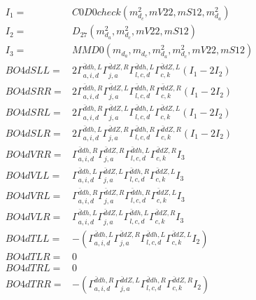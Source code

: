 \documentclass[A4,landscape]{article}
\begin{document}
\begin{align} 
I_1 = & C0D0check(m^2_{d_{{c}}}, mV22, mS12, m^2_{d_{{a}}}) \\ 
I_2 = & D_{27}(m^2_{d_{{a}}}, m^2_{d_{{c}}}, mV22, mS12) \\ 
I_3 = & MMD0(m_{d_{{a}}}, m_{d_{{c}}}, m^2_{d_{{a}}}, m^2_{d_{{c}}}, mV22, mS12) \\ 
  BO4dSLL= & 2  \Gamma^{\bar{d}d h ,L}_{a, i, d} \Gamma^{\bar{d}d Z ,R}_{j, a} \Gamma^{\bar{d}d h ,L}_{l, c, d} \Gamma^{\bar{d}d Z ,L}_{c, k} (I_1 - 2 I_2) \\ 
  BO4dSRR= & 2  \Gamma^{\bar{d}d h ,R}_{a, i, d} \Gamma^{\bar{d}d Z ,L}_{j, a} \Gamma^{\bar{d}d h ,R}_{l, c, d} \Gamma^{\bar{d}d Z ,R}_{c, k} (I_1 - 2 I_2) \\ 
  BO4dSRL= & 2  \Gamma^{\bar{d}d h ,R}_{a, i, d} \Gamma^{\bar{d}d Z ,L}_{j, a} \Gamma^{\bar{d}d h ,L}_{l, c, d} \Gamma^{\bar{d}d Z ,L}_{c, k} (I_1 - 2 I_2) \\ 
  BO4dSLR= & 2  \Gamma^{\bar{d}d h ,L}_{a, i, d} \Gamma^{\bar{d}d Z ,R}_{j, a} \Gamma^{\bar{d}d h ,R}_{l, c, d} \Gamma^{\bar{d}d Z ,R}_{c, k} (I_1 - 2 I_2) \\ 
  BO4dVRR= &  \Gamma^{\bar{d}d h ,R}_{a, i, d} \Gamma^{\bar{d}d Z ,R}_{j, a} \Gamma^{\bar{d}d h ,L}_{l, c, d} \Gamma^{\bar{d}d Z ,R}_{c, k} I_3 \\ 
  BO4dVLL= &  \Gamma^{\bar{d}d h ,L}_{a, i, d} \Gamma^{\bar{d}d Z ,L}_{j, a} \Gamma^{\bar{d}d h ,R}_{l, c, d} \Gamma^{\bar{d}d Z ,L}_{c, k} I_3 \\ 
  BO4dVRL= &  \Gamma^{\bar{d}d h ,R}_{a, i, d} \Gamma^{\bar{d}d Z ,R}_{j, a} \Gamma^{\bar{d}d h ,R}_{l, c, d} \Gamma^{\bar{d}d Z ,L}_{c, k} I_3 \\ 
  BO4dVLR= &  \Gamma^{\bar{d}d h ,L}_{a, i, d} \Gamma^{\bar{d}d Z ,L}_{j, a} \Gamma^{\bar{d}d h ,L}_{l, c, d} \Gamma^{\bar{d}d Z ,R}_{c, k} I_3 \\ 
  BO4dTLL= & -( \Gamma^{\bar{d}d h ,L}_{a, i, d} \Gamma^{\bar{d}d Z ,R}_{j, a} \Gamma^{\bar{d}d h ,L}_{l, c, d} \Gamma^{\bar{d}d Z ,L}_{c, k} I_2) \\ 
  BO4dTLR= & 0 \\ 
  BO4dTRL= & 0 \\ 
  BO4dTRR= & -( \Gamma^{\bar{d}d h ,R}_{a, i, d} \Gamma^{\bar{d}d Z ,L}_{j, a} \Gamma^{\bar{d}d h ,R}_{l, c, d} \Gamma^{\bar{d}d Z ,R}_{c, k} I_2) \\ 
\end{align} 
\end{document}
